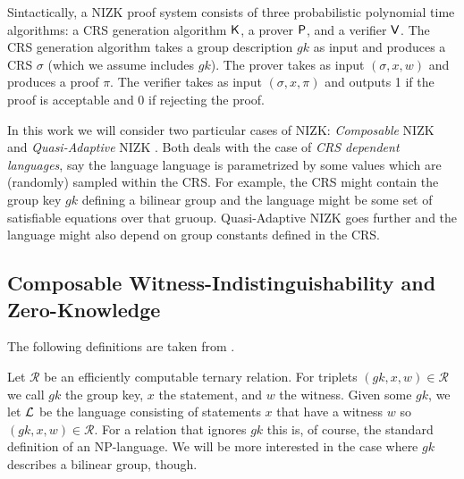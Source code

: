 Sintactically, a NIZK proof system consists of three probabilistic polynomial time algorithms: a CRS
generation algorithm $\mathsf{K}$, a prover $\mathsf{P}$, and a verifier $\mathsf{V}$.
The CRS generation algorithm takes a group description $gk$ as input and produces a CRS $\sigma$ (which we assume includes $gk$). The prover takes as input $(\sigma, x, w)$ and produces a proof $\pi$. The verifier takes as input $(\sigma, x, \pi)$ and outputs 1 if the proof is acceptable and 0 if rejecting the proof.

In this work we will consider two particular cases of NIZK: \emph{Composable} NIZK \cite{EC:GroSah08} and  \emph{Quasi-Adaptive} NIZK \cite{AC:JutRoy13}. Both deals with the case of \emph{CRS dependent languages}, say the language language is parametrized by some values which are (randomly) sampled within the CRS. For example, the CRS might contain the group key $gk$ defining a bilinear group and the language might be some set of satisfiable equations over that gruoup. Quasi-Adaptive NIZK goes further and the language might also depend on group constants defined in the CRS.
 
\subsection{Composable Witness-Indistinguishability and Zero-Knowledge}
The following definitions are taken from \cite{SIAMJC:GroSah12}.

\begin{definition} Let $\mathcal{R}$ be an efficiently computable ternary relation.
For triplets $(gk, x, w)\in \mathcal{R}$ we call $gk$ the group key, $x$ the statement, and $w$ the witness.
Given some $gk$, we let $\mathcal{L}$ be the language consisting of statements $x$ that have a
witness $w$ so $(gk, x, w) \in \mathcal{R}$. For a relation that ignores $gk$ this is, of course, the
standard definition of an NP-language. We will be more interested in the case where
$gk$ describes a bilinear group, though.
\end{definition}

